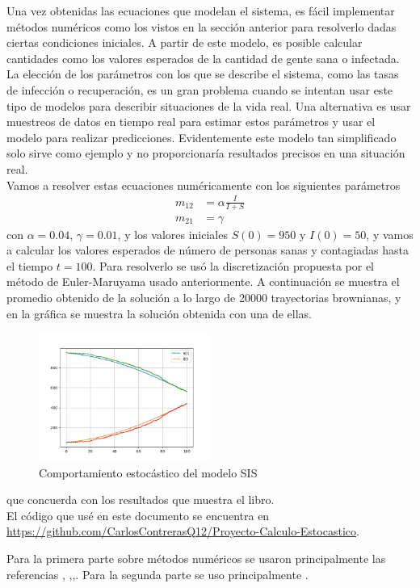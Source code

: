 \documentclass{article}
\begin{document}
\noindent
Una vez obtenidas las ecuaciones que modelan el sistema, es fácil implementar métodos numéricos como los vistos en la sección anterior para resolverlo dadas ciertas condiciones iniciales. A partir de este modelo, es posible calcular cantidades como los valores esperados de la cantidad de gente sana o infectada.\\

\noindent
La elección de los parámetros con los que se describe el sistema, como las tasas de infección o recuperación, es un gran problema cuando se intentan usar este tipo de modelos para describir situaciones de la vida real. Una alternativa es usar muestreos de datos en tiempo real para estimar estos parámetros y usar el modelo para realizar predicciones. Evidentemente este modelo tan simplificado solo sirve como ejemplo y no proporcionaría resultados precisos en una situación real.\\

\noindent 
Vamos a resolver estas ecuaciones numéricamente con los siguientes parámetros 
\begin{equation*}
\begin{split}
        m_{12}&=\alpha \frac{I}{I+S}\\
        m_{21}&=\gamma
\end{split}
\end{equation*}
con $\alpha=0.04$, $\gamma=0.01$, y los valores iniciales $S(0)=950$ y $I(0)=50$, y vamos a calcular los valores esperados de número de personas sanas y contagiadas hasta el tiempo $t=100$. Para resolverlo se usó la discretización propuesta por el método de Euler-Maruyama usado anteriormente. A continuación se muestra el promedio obtenido de la solución a lo largo de 20000 trayectorias brownianas, y en la gráfica se muestra la solución obtenida con una de ellas.
\begin{figure}[H]
    \centering
    \includegraphics[width=0.5\textwidth]{SimulacionEpide.png}
    \caption{Comportamiento estocástico del modelo SIS}
    \label{fig:my_label}
\end{figure}
que concuerda con los resultados que muestra el libro.\\

\noindent
El  código que usé en este documento se encuentra en \url{https://github.com/CarlosContrerasQ12/Proyecto-Calculo-Estocastico}.

\noindent
Para la primera parte sobre métodos numéricos se usaron principalmente las referencias \cite{Platen1999}, \cite{Numerica85:online},\cite{Higham2001},\cite{vomScheidt1989}. Para la segunda parte se uso principalmente \cite{2007}.




\end{document}
